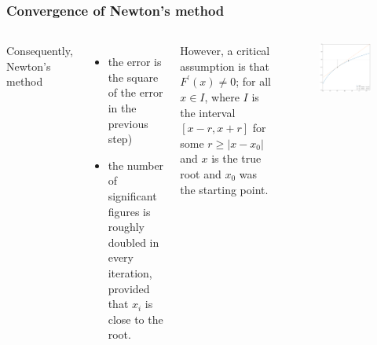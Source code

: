 \documentclass[hyperref={colorlinks=true}]{beamer}
\begin{document}

\begin{frame}%
  \frametitle{Convergence of Newton's method}

  \begin{columns}
  
   
      Consequently, Newton's method 
      \begin{itemize}
        \item the error is the square of the error in the previous step)
        \item the number of significant figures is roughly doubled in every iteration, provided that $x_i$ is  close to the root.
      \end{itemize} 
         
      However, a critical assumption is that $F^{\prime}(x) \neq 0$; for all $x \in I$, where $I$ is the interval $[x - r, x + r]$ for some $r \geq |x - x_0|$ and $x$ is the true root and $x_0$ was the starting point.
         
    
      \begin{figure}
        \includegraphics[width=\columnwidth]{NewtonsMethodExample-lnx.png}
      \end{figure}
    
  \end{columns}

\end{frame}
\end{document}
